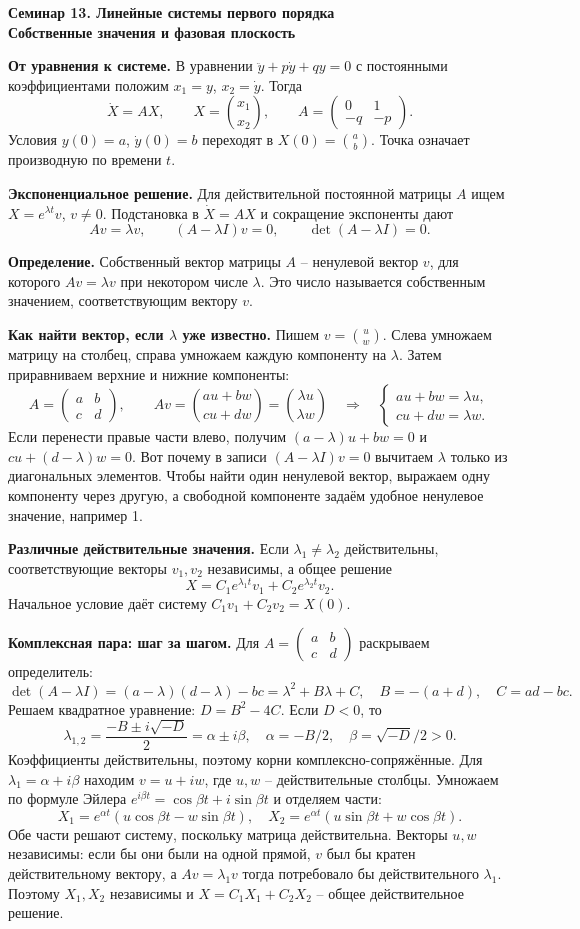 \documentclass[12pt,a4paper]{article}
\newcommand{\col}[2]{\binom{#1}{#2}}
\newcommand{\mat}[4]{\begin{pmatrix}#1&#2\\#3&#4\end{pmatrix}}
\newcommand{\st}[1]{\par\medskip\noindent\textbf{#1}\quad}
\begin{document}
\begin{center}\bfseries Семинар 13. Линейные системы первого порядка\\ Собственные значения и фазовая плоскость\end{center}
\st{От уравнения к системе.} В уравнении $\ddot y+p\dot y+qy=0$ с постоянными коэффициентами положим $x_1=y$, $x_2=\dot y$. Тогда
\[\dot X=AX,\qquad X=\col{x_1}{x_2},\qquad A=\mat{0}{1}{-q}{-p}.\]
Условия $y(0)=a$, $\dot y(0)=b$ переходят в $X(0)=\col ab$. Точка означает производную по времени $t$.
\st{Экспоненциальное решение.} Для действительной постоянной матрицы $A$ ищем $X=e^{\lambda t}v$, $v\ne0$. Подстановка в $\dot X=AX$ и сокращение экспоненты дают
\[Av=\lambda v,\qquad (A-\lambda I)v=0,\qquad \det(A-\lambda I)=0.\]
\st{Определение.} Собственный вектор матрицы $A$ -- ненулевой вектор $v$,
для которого $Av=\lambda v$ при некотором числе $\lambda$. Это число
называется собственным значением, соответствующим вектору $v$.

\st{Как найти вектор, если $\lambda$ уже известно.} Пишем $v=\col{u}{w}$.
Слева умножаем матрицу на столбец, справа умножаем каждую компоненту на
$\lambda$. Затем приравниваем верхние и нижние компоненты:
\[
A=\mat{a}{b}{c}{d},\qquad
Av=\col{au+bw}{cu+dw}=\col{\lambda u}{\lambda w}
\quad\Longrightarrow\quad
\begin{cases}au+bw=\lambda u,\\ cu+dw=\lambda w.\end{cases}
\]
Если перенести правые части влево, получим $(a-\lambda)u+bw=0$ и
$cu+(d-\lambda)w=0$. Вот почему в записи $(A-\lambda I)v=0$
вычитаем $\lambda$ только из диагональных элементов. Чтобы найти один
ненулевой вектор, выражаем одну компоненту через другую, а свободной
компоненте задаём удобное ненулевое значение, например 1.
\st{Различные действительные значения.} Если $\lambda_1\ne\lambda_2$ действительны, соответствующие векторы $v_1,v_2$ независимы, а общее решение
\[X=C_1e^{\lambda_1t}v_1+C_2e^{\lambda_2t}v_2.\]
Начальное условие даёт систему $C_1v_1+C_2v_2=X(0)$.
\st{Комплексная пара: шаг за шагом.} Для $A=\mat abcd$ раскрываем определитель:
\[\det(A-\lambda I)=(a-\lambda)(d-\lambda)-bc=\lambda^2+B\lambda+C,\quad B=-(a+d),\quad C=ad-bc.\]
Решаем квадратное уравнение: $D=B^2-4C$. Если $D<0$, то
\[\lambda_{1,2}=\frac{-B\pm i\sqrt{-D}}2=\alpha\pm i\beta,\quad \alpha=-B/2,\quad\beta=\sqrt{-D}/2>0.\]
Коэффициенты действительны, поэтому корни комплексно-сопряжённые. Для $\lambda_1=\alpha+i\beta$ находим $v=u+iw$, где $u,w$ -- действительные столбцы. Умножаем по формуле Эйлера $e^{i\beta t}=\cos\beta t+i\sin\beta t$ и отделяем части:
\[X_1=e^{\alpha t}(u\cos\beta t-w\sin\beta t),\quad X_2=e^{\alpha t}(u\sin\beta t+w\cos\beta t).\]
Обе части решают систему, поскольку матрица действительна. Векторы $u,w$ независимы: если бы они были на одной прямой, $v$ был бы кратен действительному вектору, а $Av=\lambda_1v$ тогда потребовало бы действительного $\lambda_1$. Поэтому $X_1,X_2$ независимы и $X=C_1X_1+C_2X_2$ -- общее действительное решение.
\end{document}
